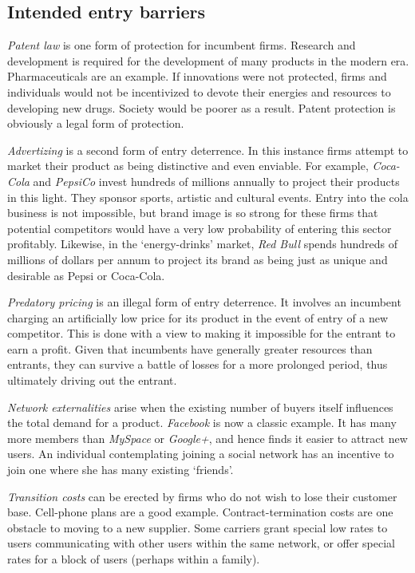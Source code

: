 \newhtmlpage

\subsection*{Intended entry barriers}

\textit{Patent law} is one form of protection for incumbent firms. Research
and development is required for the development of many products in the
modern era. Pharmaceuticals are an example. If innovations were not
protected, firms and individuals would not be incentivized to devote their
energies and resources to developing new drugs. Society would be poorer as a
result. Patent protection is obviously a legal form of protection.

\textit{Advertizing} is a second form of entry deterrence. In this instance
firms attempt to market their product as being distinctive 
and even enviable. For example, \textit{Coca-Cola}
and \textit{PepsiCo} invest hundreds of millions annually to project their products
in this light. They sponsor sports, artistic and cultural events. Entry
into the cola business is not impossible, but brand image is so strong for
these firms that potential competitors would have a very low probability of
entering this sector profitably. Likewise, in the `energy-drinks' market,
\textit{Red Bull} spends hundreds of millions of dollars per annum to project its
brand as being just as unique and desirable as Pepsi or Coca-Cola.

\textit{Predatory pricing} is an illegal form of entry deterrence. It
involves an incumbent charging an artificially low price for its product in
the event of entry of a new competitor. This is done with a view to making
it impossible for the entrant to earn a profit. Given that incumbents have
generally greater resources than entrants, they can survive a battle of
losses for a more prolonged period, thus ultimately driving out the entrant.

\textit{Network externalities} arise when the existing number of buyers
itself influences the total demand for a product. \textit{Facebook} is now a
classic example. It has many more members than \textit{MySpace} or \textit{Google+}, and hence
finds it easier to attract new users. An individual contemplating joining a
social network has an incentive to join one where she has many existing
`friends'.

\textit{Transition costs} can be erected by firms who do not wish to lose
their customer base. Cell-phone plans are a good example.
Contract-termination costs are one obstacle to moving to a new supplier.
Some carriers grant special low rates to users communicating with other
users within the same network, or offer special rates for a block of users
(perhaps within a family).

